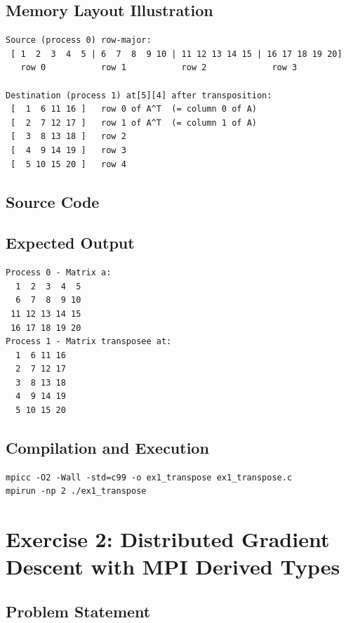 \documentclass[11pt,a4paper]{article}
\begin{document}
\subsection{Memory Layout Illustration}

\begin{verbatim}
Source (process 0) row-major:
 [ 1  2  3  4  5 | 6  7  8  9 10 | 11 12 13 14 15 | 16 17 18 19 20]
   row 0           row 1           row 2             row 3

Destination (process 1) at[5][4] after transposition:
 [  1  6 11 16 ]   row 0 of A^T  (= column 0 of A)
 [  2  7 12 17 ]   row 1 of A^T  (= column 1 of A)
 [  3  8 13 18 ]   row 2
 [  4  9 14 19 ]   row 3
 [  5 10 15 20 ]   row 4
\end{verbatim}

\subsection{Source Code}



\subsection{Expected Output}

\begin{verbatim}
Process 0 - Matrix a:
  1  2  3  4  5
  6  7  8  9 10
 11 12 13 14 15
 16 17 18 19 20
Process 1 - Matrix transposee at:
  1  6 11 16
  2  7 12 17
  3  8 13 18
  4  9 14 19
  5 10 15 20
\end{verbatim}

\subsection{Compilation and Execution}

\begin{verbatim}
mpicc -O2 -Wall -std=c99 -o ex1_transpose ex1_transpose.c
mpirun -np 2 ./ex1_transpose
\end{verbatim}

\section{Exercise 2: Distributed Gradient Descent with MPI Derived Types}

\subsection{Problem Statement}
\end{document}
